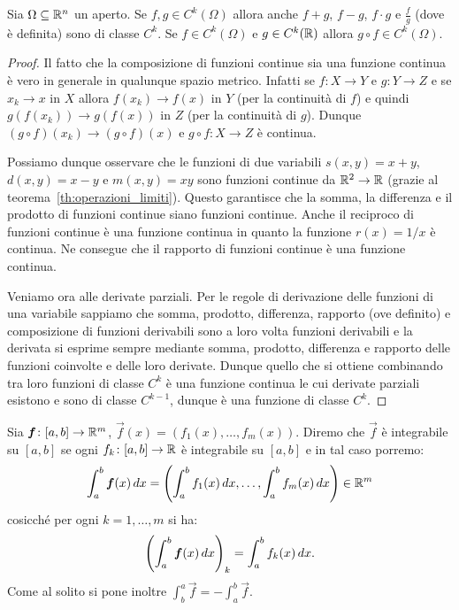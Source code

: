 \begin{theorem}
Sia $\Omega \subseteq \mathbb R^n$ un aperto.
Se $f,g\in C^k(\Omega)$ allora anche $f+g$, $f-g$, $f\cdot g$ e $\frac{f}{g}$
(dove è definita) sono di classe $C^k$. Se $f\in C^k(\Omega)$ e $g\in C^k(\mathbb R)$
allora $g\circ f \in C^k(\Omega)$.
\end{theorem}
%
\begin{proof}
Il fatto che la composizione di funzioni continue sia una funzione continua
è vero in generale in qualunque spazio metrico.
Infatti se $f\colon X\to Y$ e $g\colon Y \to Z$ e se $x_k\to x$ in $X$
allora $f(x_k) \to f(x)$ in $Y$ (per la continuità di $f$)
e quindi $g(f(x_k)) \to g(f(x))$ in $Z$ (per la continuità di $g$).
Dunque $(g \circ f)(x_k) \to (g\circ f)(x)$ e $g\circ f\colon X\to Z$ è continua.

Possiamo dunque osservare che le funzioni di due variabili $s(x,y) = x+y$,
$d(x,y)=x-y$ e
$m(x,y)=xy$ sono funzioni continue da $\mathbb R^2\to \mathbb R$ 
(grazie al teorema~\ref{th:operazioni_limiti}). 
Questo garantisce
che la somma, la differenza e il prodotto di funzioni continue siano funzioni continue.
Anche il reciproco di funzioni continue è una funzione continua
in quanto la funzione $r(x)=1/x$ è continua.
Ne consegue che il rapporto di funzioni continue è una
funzione continua.

Veniamo ora alle derivate parziali.
Per le regole di derivazione delle funzioni di una variabile sappiamo che
somma, prodotto, differenza, rapporto (ove definito) e composizione
di funzioni derivabili sono
a loro volta funzioni derivabili e la derivata si esprime sempre mediante
somma, prodotto, differenza e rapporto delle funzioni coinvolte e delle loro
derivate. Dunque quello che si ottiene combinando tra loro funzioni
di classe $C^k$ è una funzione continua le cui derivate parziali esistono e
sono di classe $C^{k-1}$, dunque è una funzione di classe $C^k$.
\end{proof}


\begin{definition}
Sia $\boldsymbol f\colon [a,b]\to \mathbb R^m$, $\vec f(x) = (f_1(x), \dots, f_m(x))$.
Diremo che $\vec f$ è integrabile su $[a,b]$ se ogni
$f_k\colon[a,b]\to \mathbb R$ è integrabile su $[a,b]$ e in tal caso porremo:
\[
  \int_a^b \boldsymbol f(x)\, dx
  = {\left( \int_a^b f_1(x)\, dx, \dots, \int_a^b f_m(x)\, dx \right)}
  \in \mathbb R^m
\]
cosicché per ogni $k=1,\dots, m$ si ha:
\[
  {\left( \int_a^b \boldsymbol f(x)\, dx \right)}_k = \int_a^b f_k(x)\, dx.
\]
Come al solito si pone inoltre $\int_b^a \vec f = - \int_a^b \vec f$.
\end{definition}

